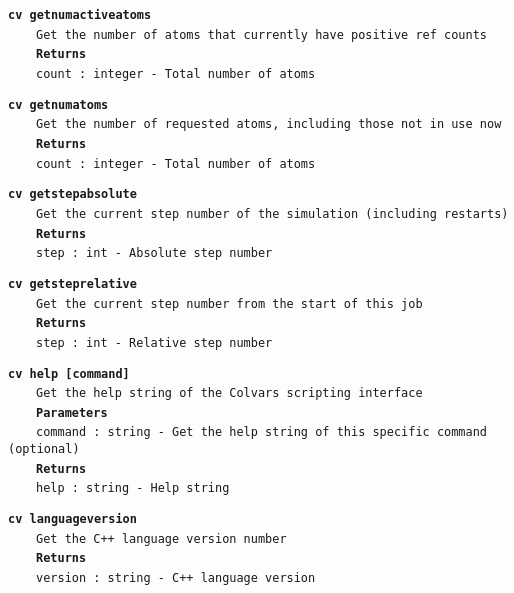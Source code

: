 \begin{mdexampleinput}{}
\texttt{\textbf{cv getnumactiveatoms}}
\\
\-~~~~\texttt{Get the number of atoms that currently have positive ref counts}
\\
\-~~~~\texttt{\textbf{Returns}}
\\
\-~~~~\texttt{count : integer - Total number of atoms}
\end{mdexampleinput}
\begin{mdexampleinput}{}
\texttt{\textbf{cv getnumatoms}}
\\
\-~~~~\texttt{Get the number of requested atoms, including those not in use now}
\\
\-~~~~\texttt{\textbf{Returns}}
\\
\-~~~~\texttt{count : integer - Total number of atoms}
\end{mdexampleinput}
\begin{mdexampleinput}{}
\texttt{\textbf{cv getstepabsolute}}
\\
\-~~~~\texttt{Get the current step number of the simulation (including restarts)}
\\
\-~~~~\texttt{\textbf{Returns}}
\\
\-~~~~\texttt{step : int - Absolute step number}
\end{mdexampleinput}
\begin{mdexampleinput}{}
\texttt{\textbf{cv getsteprelative}}
\\
\-~~~~\texttt{Get the current step number from the start of this job}
\\
\-~~~~\texttt{\textbf{Returns}}
\\
\-~~~~\texttt{step : int - Relative step number}
\end{mdexampleinput}
\begin{mdexampleinput}{}
\texttt{\textbf{cv help [command]}}
\\
\-~~~~\texttt{Get the help string of the Colvars scripting interface}
\\
\-~~~~\texttt{\textbf{Parameters}}
\\
\-~~~~\texttt{command : string - Get the help string of this specific command (optional)}
\\
\-~~~~\texttt{\textbf{Returns}}
\\
\-~~~~\texttt{help : string - Help string}
\end{mdexampleinput}
\begin{mdexampleinput}{}
\texttt{\textbf{cv languageversion}}
\\
\-~~~~\texttt{Get the C++ language version number}
\\
\-~~~~\texttt{\textbf{Returns}}
\\
\-~~~~\texttt{version : string - C++ language version}
\end{mdexampleinput}
